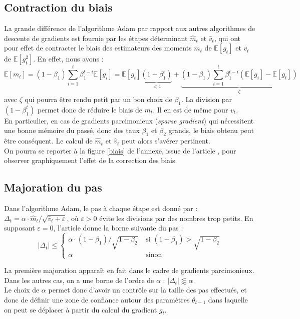 \documentclass[11pt,a4paper, french]{article}
\newcommand{\dsum}[2]{\displaystyle\sum_{#1}^{#2}}
\theoremstyle{definition}
\begin{document}
\subsection{Contraction du biais}

La grande différence de l'algorithme Adam par rapport aux autres algorithmes de descente de gradients est fournie par les étapes déterminant $\widehat m_t$ et $\widehat v_t$, qui ont pour effet de contracter le biais des estimateurs des moments $m_t$ de $\mathbb E[g_t]$ et $v_t$ de $\mathbb E[g_t^2]$. En effet, nous avons :
$$\mathbb E[m_t]=(1-\beta_1)\dsum{i=1}t\beta_1^{t-i}\mathbb E[g_i]= \mathbb E[g_t]\underset{<1}{\underbrace{(1-\beta_1^t)}}+\underset{\zeta}{\underbrace{(1-\beta_1)\dsum{i=1}t\beta_1^{t-i}(\mathbb E[g_i]-\mathbb E[g_t])}}$$
avec $\zeta$ qui pourra être rendu petit par un bon choix de $\beta_1$. La division par $(1-\beta_1^t)$ permet donc de réduire le biais de $m_t$. Il en est de même pour $v_t$. \\
En particulier, en cas de gradients parcimonieux (\textit{sparse gradient}) qui nécessitent une bonne mémoire du passé, donc des taux $\beta_1$ et $\beta_2$ grands, le biais obtenu peut être conséquent. Le calcul de $\widehat m_t$ et $\widehat v_t$ peut alors s'avérer pertinent.\\
On pourra se reporter à la figure \ref{biais} de l'annexe, issue de l'article \cite{kingma2017adammethodstochasticoptimization}, pour observer graphiquement l'effet de la correction des biais.


\subsection{Majoration du pas}

Dans l'algorithme Adam, le pas à chaque étape est donné par : $\Delta_t=\alpha\cdotp \widehat m_t/\sqrt{\widehat v_t+\varepsilon}$, où $\varepsilon>0$ évite les divisions par des nombres trop petits. En supposant $\varepsilon=0$, l'article donne la borne suivante du pas : 
$$|\Delta_t|\leqslant \left\{\begin{array}{ll}
\alpha\cdotp (1-\beta_1)/\sqrt{1-\beta_2} & \text{ si }(1-\beta_1)>\sqrt{1-\beta_2}\\
\alpha & \text{ sinon}
\end{array}\right.
$$

La première majoration apparaît en fait dans le cadre de gradients parcimonieux. Dans les autres cas, on a une borne de l'ordre de $\alpha$ : $|\Delta_t|\lessapprox \alpha$.\\
Le choix de $\alpha$ permet donc d'avoir un contrôle sur la taille des pas effectués, et donc de définir une \og zone de confiance\fg{} autour des paramètres $\theta_{t-1}$ dans laquelle on peut se déplacer à partir du calcul du gradient $g_t$.
\end{document}
